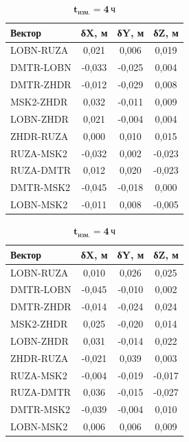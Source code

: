 \begin{table} [htbp]
{\begin{subtable}{.47\linewidth}
\begin{tabular}{ l
					S[table-number-alignment = center]
					S[table-number-alignment = center]
					S[table-number-alignment = center] }
				
				\hline
				\textbf{Вектор}				& \textbf{δX, м}	& \textbf{δY, м}	& \textbf{δZ, м}	\\ \hline
				LOBN-RUZA					&      0,021		& 	   0,006		&      0,019		\\ %
				DMTR-LOBN					&     -0,033		&     -0,025		&      0,004		\\ %
				DMTR-ZHDR					&     -0,012		&     -0,029		&      0,008		\\ %
				MSK2-ZHDR					&      0,032		&     -0,011		&      0,009		\\ %
				LOBN-ZHDR					&      0,021		&     -0,004		&      0,004		\\ %
				ZHDR-RUZA					&      0,000		&      0,010		&      0,015		\\ %
				RUZA-MSK2					&     -0,032		&      0,002		&     -0,023		\\ %
				RUZA-DMTR					&      0,012		&      0,020		&     -0,023		\\ %
				DMTR-MSK2					&     -0,045		&     -0,018		&      0,000		\\ %
				LOBN-MSK2					&     -0,011		&      0,008		&     -0,005		\\ \hline
				
				
			\end{tabular}
		\end{subtable}%
		\qquad
		\begin{subtable}{.47\linewidth}	
			\centering
			\caption*{$\mathbf{t_\text{изм.}=4\,\text{ч}}$}
			\begin{tabular}{ l
					S[table-number-alignment = center]
					S[table-number-alignment = center]
					S[table-number-alignment = center] }
				
				
				\hline
				\textbf{Вектор}				& \textbf{δX, м}	& \textbf{δY, м}	& \textbf{δZ, м}	\\ \hline
				LOBN-RUZA					&      0,010		& 	   0,026		&      0,025		\\ %
				DMTR-LOBN					&     -0,045		&     -0,010		&      0,002		\\ %
				DMTR-ZHDR					&     -0,014		&     -0,024		&      0,024		\\ %
				MSK2-ZHDR					&      0,025		&     -0,020		&      0,014		\\ %
				LOBN-ZHDR					&      0,031		&     -0,014		&      0,022		\\ %
				ZHDR-RUZA					&     -0,021		&      0,039		&      0,003		\\ %
				RUZA-MSK2					&     -0,004		&     -0,019		&     -0,017		\\ %
				RUZA-DMTR					&      0,036		&     -0,015		&     -0,027		\\ %
				DMTR-MSK2					&     -0,039		&     -0,004		&      0,010		\\ %
				LOBN-MSK2					&      0,006		&      0,006		&      0,009		\\ \hline
				

\end{tabular}
\end{subtable}}
\end{table}
